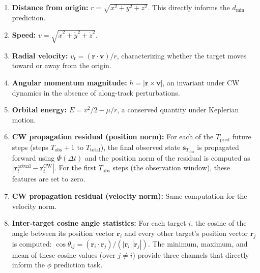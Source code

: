 \documentclass[a4paper,fleqn]{cas-dc}
\newcommand{\biPhi}{\bm{\mathit{\Phi}}} %
\begin{document}
\begin{enumerate}
    \item \textbf{Distance from origin:} $r = \sqrt{x^2 + y^2 + z^2}$. This directly informs the $d_{\min}$ prediction.
    \item \textbf{Speed:} $v = \sqrt{\dot{x}^2 + \dot{y}^2 + \dot{z}^2}$.
    \item \textbf{Radial velocity:} $v_{\mathrm{r}} = (\bm{r} \cdot \bm{v}) / r$, characterizing whether the target moves toward or away from the origin.
    \item \textbf{Angular momentum magnitude:} $h = |\bm{r} \times \bm{v}|$, an invariant under CW dynamics in the absence of along-track perturbations.
    \item \textbf{Orbital energy:} $E = v^2/2 - \mu/r$, a conserved quantity under Keplerian motion.
    \item \textbf{CW propagation residual (position norm):} For each of the $T_{\text{pred}}$ future steps (steps $T_{\text{obs}}+1$ to $T_{\text{total}}$), the final observed state $\bm{s}_{T_{\text{obs}}}$ is propagated forward using $\biPhi(\Delta t)$ and the position norm of the residual is computed as $|\bm{r}_t^{\text{actual}} - \bm{r}_t^{\text{CW}}|$. For the first $T_{\text{obs}}$ steps (the observation window), these features are set to zero.
    \item \textbf{CW propagation residual (velocity norm):} Same computation for the velocity norm.
    \item[8--10.] \textbf{Inter-target cosine angle statistics:} For each target $i$, the cosine of the angle between its position vector $\bm{r}_i$ and every other target's position vector $\bm{r}_j$ is computed: $\cos\theta_{ij} = (\bm{r}_i \cdot \bm{r}_j) / (|\bm{r}_i| |\bm{r}_j|)$. The minimum, maximum, and mean of these cosine values (over $j \neq i$) provide three channels that directly inform the $\phi$ prediction task.
\end{enumerate}
\end{document}
